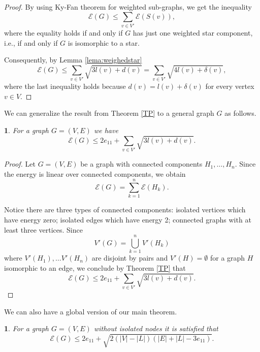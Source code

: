 \documentclass[a4paper]{article}
\newcommand{\abs}[1]{\left\lvert#1\right\rvert}
\newcommand{\energy}[1]{\mathcal{E}\left(#1\right)}
\theoremstyle{plain}
\newtheorem{theorem}{\protect\thmaname}
\newtheorem{corollary}{\protect\corname}
\renewcommand{\thmaname}{Theorem}%
\renewcommand{\corname}{Corollary}
\renewcommand{\thmaname}{Teorema}%
\renewcommand{\corname}{Corolario}
\begin{document}
\begin{proof}
    By using Ky-Fan theorem for weighted sub-graphs, we get the inequality
    \[
        \energy G \leq \sum_{v \in V'} \energy{S(v)},
    \]
    where the equality holds if and only if \(G\) has just one weighted star component, i.e., if and only if \(G\) is isomorphic to a star.

Consequently, by Lemma \ref{lema:weighedstar}
    \[
        \energy G \leq \sum_{v \in V'} \sqrt{3l(v) + d(v)} = \sum_{v \in V'} \sqrt{4l(v) + \delta(v)},
    \]
    where the last inequality holds because \(d(v) = l(v) + \delta(v)\) for every vertex \(v \in V\).
    
\end{proof}

We can generalize the result from Theorem \ref{TP} to a general graph \(G\) as follows.

\begin{theorem}\label{TPG}
    For a graph \(G = (V,E)\) we have
    \[
    \energy G \leq 2 e_{11} + \sum_{v \in V'} \sqrt{3l(v) + d(v)}.
    \]
    
\end{theorem}

\begin{proof}
    Let \(G = (V,E)\) be a graph with connected components \(H_1, \ldots, H_n\). Since the energy is linear over connected components, we obtain
    \[
    \energy G = \sum_{k = 1}^n \energy{H_k}.
    \]

    Notice there are three types of connected components: isolated vertices which have energy zero; isolated edges which have energy 2; connected graphs with at least three vertices. Since
    \[
        V'(G) = \bigcup_{k = 1}^n V'(H_k)
    \]
    where \(V'(H_1), \ldots V'(H_n)\) are disjoint by pairs and \(V'(H) = \emptyset\) for a graph \(H\) isomorphic to an edge, we conclude by Theorem \ref{TP} that
    \[
        \energy G \leq 2 e_{11} + \sum_{v \in V'} \sqrt{3l(v) + d(v)}.
    \]
    
\end{proof}

We can also have a global version of our main theorem.
 
\begin{corollary}\label{global_bound}
    For a graph \(G = (V,E)\) without isolated nodes
    it is satisfied that
    \[
        \energy G \leq  2 e_{11} + \sqrt{2(\abs{V} - \abs{L})(\abs{E} + \abs{L} - 3 e_{11})}.
    \]
    
\end{corollary}
\end{document}
